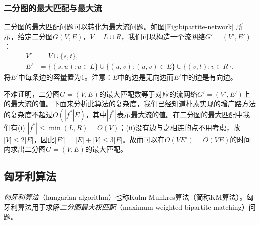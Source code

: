 \documentclass[a4paper]{ctexbook}
\begin{document}
  \subsubsection{二分图的最大匹配与最大流}
  二分图的最大匹配问题可以转化为最大流问题。如图\ref{Fig:bipartite-network} 所示，给定二分图$G(V,E)$，$V=L\cup R$，我们可以构造一个流网络$G'=(V',E')$：
  \begin{align*}
    V'&=V\cup\{s,t\},\\
    E'&=\{(s,u)\colon u\in L\}\cup\{(u,v)\colon(u,v)\in E\}\cup\{(v,t)\colon v\in R\}.
  \end{align*}
  将$E'$中每条边的容量置为$1$。注意：$E$中的边是无向边而$E'$中的边是有向边。

  不难证明，二分图$G=(V,E)$的最大匹配数等于对应的流网络$G'=(V',E')$上的最大流的值。下面来分析此算法的复杂度，我们已经知道朴素实现的增广路方法的复杂度不超过$O(|f^*|E)$，其中$|f^*|$表示最大流的值。在二分图的最大匹配中我们有(i) $|f^*|\le\min(L,R)=O(V)$；(ii)没有边与之相连的点不用考虑，故$|V|\le 2|E|$，因此$|E'|=|E|+|V|\le3|E|$。故而可以在$O(VE')=O(VE)$的时间内求出二分图$G=(V,E)$的最大匹配。
  \subsection{匈牙利算法}
  \emph{匈牙利算法}（hungarian algorithm）也称Kuhn-Munkres算法（简称KM算法）。匈牙利算法用于求解\emph{二分图最大权匹配}（maximum weighted bipartite matching）问题。
\end{document}

